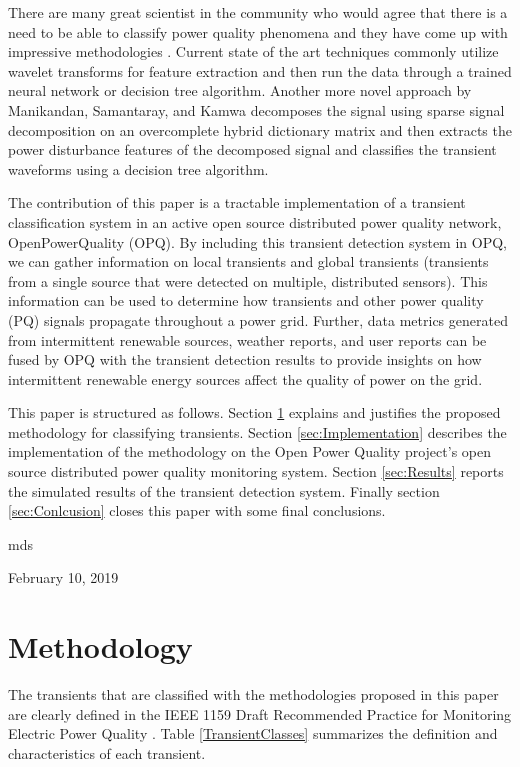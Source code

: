 \documentclass[10pt,conference,compsocconf]{IEEEtran}
\begin{document}
There are many great scientist in the community who would agree that there is a need to be able to classify power quality phenomena and they have come up with impressive methodologies \cite{Garrido:2014:PhenomenaClassification, Manikandan:2014:PQClassificationUsingSSD, Thirumala:2016:PQClassificationUsingWavelet, Rodriguez:2014:PQClassificationUsingANN, Tse:2012:PQClassificationUsingHHT}. Current state of the art techniques commonly utilize wavelet transforms for feature extraction and then run the data through a trained neural network or decision tree algorithm.  Another more novel approach by Manikandan, Samantaray, and Kamwa \cite{Manikandan:2014:PQClassificationUsingSSD} decomposes the signal using sparse signal decomposition on an overcomplete hybrid dictionary matrix and then extracts the power disturbance features of the decomposed signal and classifies the transient waveforms using a decision tree algorithm. 

The contribution of this paper is a tractable implementation of a transient classification system in an active open source distributed power quality network, OpenPowerQuality (OPQ). By including this transient detection system in OPQ, we can gather information on local transients and global transients (transients from a single source that were detected on multiple, distributed sensors). This information can be used to determine how transients and other power quality (PQ) signals propagate throughout a power grid. Further, data metrics generated from intermittent renewable sources, weather reports, and user reports can be fused by OPQ with the transient detection results to provide insights on how intermittent renewable energy sources affect the quality of power on the grid.

This paper is structured as follows. Section \ref{sec:Methodology} explains and justifies the proposed methodology for classifying transients. Section \ref{sec:Implementation} describes the implementation of the methodology on the Open Power Quality project's open source distributed power quality monitoring system. Section \ref{sec:Results} reports the simulated results of the transient detection system. Finally section \ref{sec:Conlcusion} closes this paper with some final conclusions.


\hfill mds
 
\hfill February 10, 2019

\section{Methodology}
\label{sec:Methodology}
The transients that are classified with the methodologies proposed in this paper are clearly defined in the IEEE 1159 Draft Recommended Practice for Monitoring Electric Power Quality \cite{IEEE:2018:1159D3}. Table \ref{TransientClasses} summarizes the definition and characteristics of each transient.
\end{document}
